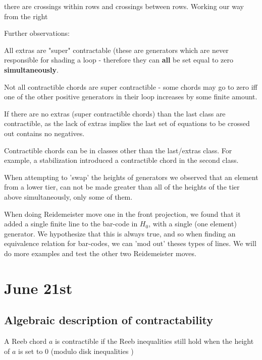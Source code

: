 \documentclass[11pt,oneside]{amsart}
\begin{document}
there are crossings within rows and crossings between rows. Working our way from the right






Further observations:

All extras are "super" contractable (these are generators which are never responsible for shading a loop - therefore they can \textbf{all} be set equal to zero \textbf{simultaneously}.

Not all contractible chords are super contractible - some chords may go to zero iff one of the other positive generators in their loop increases by some finite amount. 


If there are no extras (super contractible chords) than the last class are contractible, as the lack of extras implies the last set of equations to be crossed out contains no negatives. 


Contractible chords can be in classes other than the last/extras class. For example, a stabilization introduced a contractible chord in the second class.

When attempting to 'swap' the heights of generators we observed that an element from a lower tier, can not be made greater than all of the heights of the tier above simultaneously, only some of them.

When doing Reidemeister move one in the front projection, we found that it added a single finite line to the bar-code in $H_0$, with a single (one element) generator. We hypothesize that this is always true, and so when finding an equivalence relation for bar-codes, we can 'mod out' theses types of lines. We will do more examples and test the other two Reidemeister moves.








\section{June 21st}


\subsection{Algebraic description of contractability}

\begin{definition}[Contractible]
    A Reeb chord $a$ is contractible if the Reeb inequalities still hold when the height of $a$ is set to $0$ (modulo disk inequalities \TODO)
\end{definition}
\end{document}
